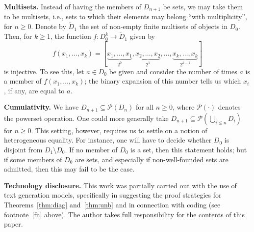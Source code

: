 \documentclass[a4paper,12pt]{article}
\theoremstyle{definition}
\theoremstyle{remark}
\begin{document}
\textbf{Multisets.} Instead of having the members of $D_{n+1}$ be sets, we may take them to be multisets, i.e., sets to which their elements may belong ``with multiplicity'', for $n \geq 0$. Denote by $\widetilde D_1$ the set of non-empty finite multisets of objects in $D_0$. Then, for $k \geq 1$, the function $f : D_0^k \to \widetilde D_1$ given by
\[f(x_1, \dots, x_k) = [\underbrace{x_1, \dots, x_1}_{2^0}, \underbrace{x_2, \dots, x_2}_{2^1}, \dots, \underbrace{x_k, \dots, x_k}_{2^{k-1}}]\]
is injective. To see this, let $a \in D_0$ be given and consider the number of times $a$ is a member of $f(x_1, \dots, x_k)$; the binary expansion of this number tells us which $x_i$, if any, are equal to $a$.

\textbf{Cumulativity.} We have $D_{n+1} \subseteq \mathcal P(D_n)$ for all $n \geq 0$, where $\mathcal P(\cdot)$ denotes the powerset operation. One could more generally take $D_{n+1} \subseteq \mathcal P\!\left(\bigcup_{i\leq n}D_i\right)$ for $n \geq 0$. This setting, however, requires us to settle on a notion of heterogeneous equality. For instance, one will have to decide whether $D_0$ is disjoint from $D_1 \setminus D_0$. If no member of $D_0$ is a set, then this statement holds; but if some members of $D_0$ are sets, and especially if non-well-founded sets are admitted, then this may fail to be the case.

\printbibliography

\bigskip

\textbf{Technology disclosure.} This work was partially carried out with the use of text generation models, specifically in suggesting the proof strategies for Theorems~\ref{thm:diag} and~\ref{thm:unb} and in connection with coding (see footnote~\ref{fn} above). The author takes full responsibility for the contents of this paper.
\end{document}
